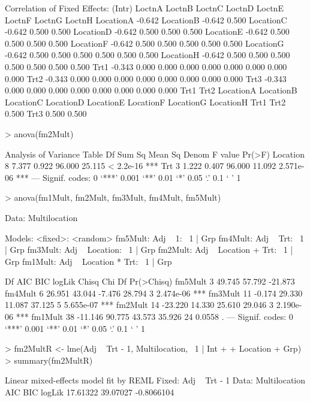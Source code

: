 \documentclass[12pt]{article}
\begin{document}
\begin{Schunk}
\begin{Soutput}
Correlation of Fixed Effects:
          (Intr) LoctnA LoctnB LoctnC LoctnD LoctnE LoctnF LoctnG LoctnH
LocationA -0.642                                                        
LocationB -0.642  0.500                                                 
LocationC -0.642  0.500  0.500                                          
LocationD -0.642  0.500  0.500  0.500                                   
LocationE -0.642  0.500  0.500  0.500  0.500                            
LocationF -0.642  0.500  0.500  0.500  0.500  0.500                     
LocationG -0.642  0.500  0.500  0.500  0.500  0.500  0.500              
LocationH -0.642  0.500  0.500  0.500  0.500  0.500  0.500  0.500       
Trt1      -0.343  0.000  0.000  0.000  0.000  0.000  0.000  0.000  0.000
Trt2      -0.343  0.000  0.000  0.000  0.000  0.000  0.000  0.000  0.000
Trt3      -0.343  0.000  0.000  0.000  0.000  0.000  0.000  0.000  0.000
          Trt1   Trt2  
LocationA              
LocationB              
LocationC              
LocationD              
LocationE              
LocationF              
LocationG              
LocationH              
Trt1                   
Trt2       0.500       
Trt3       0.500  0.500
\end{Soutput}
\begin{Sinput}
> anova(fm2Mult)
\end{Sinput}
\begin{Soutput}
Analysis of Variance Table
         Df Sum Sq Mean Sq  Denom F value    Pr(>F)    
Location  8  7.377   0.922 96.000  25.115 < 2.2e-16 ***
Trt       3  1.222   0.407 96.000  11.092 2.571e-06 ***
---
Signif. codes:  0 `***' 0.001 `**' 0.01 `*' 0.05 `.' 0.1 ` ' 1 
\end{Soutput}
\begin{Sinput}
> anova(fm1Mult, fm2Mult, fm3Mult, fm4Mult, fm5Mult)
\end{Sinput}
\begin{Soutput}
Data: Multilocation

Models: <fixed>: <random>
fm5Mult: Adj ~ 1: ~1 | Grp
fm4Mult: Adj ~ Trt: ~1 | Grp
fm3Mult: Adj ~ Location: ~1 | Grp
fm2Mult: Adj ~ Location + Trt: ~1 | Grp
fm1Mult: Adj ~ Location * Trt: ~1 | Grp

        Df     AIC     BIC  logLik  Chisq Chi Df Pr(>Chisq)    
fm5Mult  3  49.745  57.792 -21.873                             
fm4Mult  6  26.951  43.044  -7.476 28.794      3  2.474e-06 ***
fm3Mult 11  -0.174  29.330  11.087 37.125      5  5.655e-07 ***
fm2Mult 14 -23.220  14.330  25.610 29.046      3  2.190e-06 ***
fm1Mult 38 -11.146  90.775  43.573 35.926     24     0.0558 .  
---
Signif. codes:  0 `***' 0.001 `**' 0.01 `*' 0.05 `.' 0.1 ` ' 1 
\end{Soutput}
\begin{Sinput}
> fm2MultR <- lme(Adj ~ Trt - 1, Multilocation, ~1 | Int + 
+     Location + Grp)
> summary(fm2MultR)
\end{Sinput}
\begin{Soutput}
Linear mixed-effects model fit by REML
Fixed: Adj ~ Trt - 1 
 Data: Multilocation 
      AIC      BIC     logLik
 17.61322 39.07027 -0.8066104


\end{Soutput}
\end{Schunk}
\end{document}
